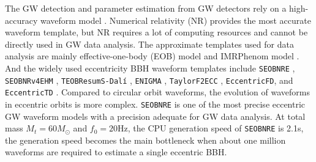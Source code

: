\documentclass[
reprint,
superscriptaddress,
amsmath,amssymb,
aps,
prd,
floatfix,
]{revtex4-2}
\begin{document}
The GW detection and parameter estimation from GW detectors rely on a high-accuracy waveform model \cite{theligoscientificcollaborationGuideLIGOVirgoDetector2020}. 
Numerical relativity (NR) provides the most accurate waveform template, but NR requires a lot of computing resources and cannot be directly used in GW data analysis. 
The approximate templates used for data analysis are mainly effective-one-body (EOB) model \cite{taracchiniEffectiveonebodyModelBlackhole2014} and IMRPhenom model \cite{husaFrequencydomainGravitationalWaves2016, khanFrequencydomainGravitationalWaves2016}. 
And the widely used eccentricity BBH waveform templates include \texttt{SEOBNRE} \cite{caoWaveformModelEccentric2017,liuHighermultipoleGravitationalWaveform2022, liuEffectiveonebodyNumericalrelativityWaveform2024}, \texttt{SEOBNRv4EHM} \cite{khalilRadiationreactionForceMultipolar2021, ramos-buadesEffectiveonebodyMultipolarWaveforms2022}, \texttt{TEOBResumS-Dalí} \cite{chiaramelloFaithfulAnalyticalEffectiveonebody2020, albertiniEffectiveonebodyWaveformsExtrememassratio2024a, nagarEffectiveonebodyWaveformModel2024a},  \texttt{ENIGMA} \cite{huertaEccentricNonspinningInspiral2018a, chenObservationEccentricBinary2021}, \texttt{TaylorF2ECC} \cite{mooreGravitationalwavePhasingLoweccentricity2016, moore3PNFourierDomain2019}, \texttt{EccentricFD}, and \texttt{EccentricTD} \cite{tanayFrequencyTimedomainInspiral2016,  tiwariProposedSearchDetection2016, lalsuite, swiglal}.
Compared to circular orbit waveforms, the evolution of waveforms in eccentric orbits is more complex. \texttt{SEOBNRE} is one of the most precise eccentric GW waveform models with a precision adequate for GW data analysis. 
At total mass $M_t=60 M_\odot$ and $f_0=20\text{Hz}$, the CPU generation speed of \texttt{SEOBNRE} is 2.1s, the generation speed becomes the main bottleneck when about one million waveforms are required to estimate a single eccentric BBH.
\end{document}
